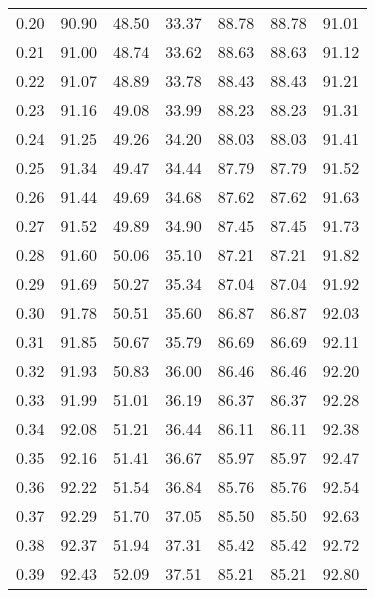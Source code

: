 \begin{tabular}{|c|c|c|c|c|c|c|}
      0.20 &     90.90 &     48.50 &      33.37 &   88.78 &      88.78 &         91.01 \\
      0.21 &     91.00 &     48.74 &      33.62 &   88.63 &      88.63 &         91.12 \\
      0.22 &     91.07 &     48.89 &      33.78 &   88.43 &      88.43 &         91.21 \\
      0.23 &     91.16 &     49.08 &      33.99 &   88.23 &      88.23 &         91.31 \\
      0.24 &     91.25 &     49.26 &      34.20 &   88.03 &      88.03 &         91.41 \\
      0.25 &     91.34 &     49.47 &      34.44 &   87.79 &      87.79 &         91.52 \\
      0.26 &     91.44 &     49.69 &      34.68 &   87.62 &      87.62 &         91.63 \\
      0.27 &     91.52 &     49.89 &      34.90 &   87.45 &      87.45 &         91.73 \\
      0.28 &     91.60 &     50.06 &      35.10 &   87.21 &      87.21 &         91.82 \\
      0.29 &     91.69 &     50.27 &      35.34 &   87.04 &      87.04 &         91.92 \\
      0.30 &     91.78 &     50.51 &      35.60 &   86.87 &      86.87 &         92.03 \\
      0.31 &     91.85 &     50.67 &      35.79 &   86.69 &      86.69 &         92.11 \\
      0.32 &     91.93 &     50.83 &      36.00 &   86.46 &      86.46 &         92.20 \\
      0.33 &     91.99 &     51.01 &      36.19 &   86.37 &      86.37 &         92.28 \\
      0.34 &     92.08 &     51.21 &      36.44 &   86.11 &      86.11 &         92.38 \\
      0.35 &     92.16 &     51.41 &      36.67 &   85.97 &      85.97 &         92.47 \\
      0.36 &     92.22 &     51.54 &      36.84 &   85.76 &      85.76 &         92.54 \\
      0.37 &     92.29 &     51.70 &      37.05 &   85.50 &      85.50 &         92.63 \\
      0.38 &     92.37 &     51.94 &      37.31 &   85.42 &      85.42 &         92.72 \\
      0.39 &     92.43 &     52.09 &      37.51 &   85.21 &      85.21 &         92.80 \\

\end{tabular}
